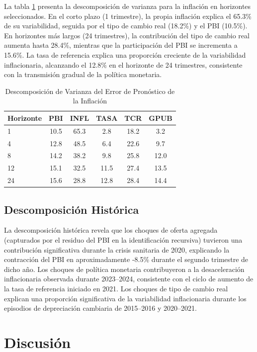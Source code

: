 \documentclass[12pt,a4paper]{article}
\begin{document}
La tabla \ref{tab:fevd} presenta la descomposición de varianza para la inflación en horizontes seleccionados. En el corto plazo (1 trimestre), la propia inflación explica el 65.3\% de su variabilidad, seguida por el tipo de cambio real (18.2\%) y el PBI (10.5\%). En horizontes más largos (24 trimestres), la contribución del tipo de cambio real aumenta hasta 28.4\%, mientras que la participación del PBI se incrementa a 15.6\%. La tasa de referencia explica una proporción creciente de la variabilidad inflacionaria, alcanzando el 12.8\% en el horizonte de 24 trimestres, consistente con la transmisión gradual de la política monetaria.

\begin{table}[H]
\centering
\caption{Descomposición de Varianza del Error de Pronóstico de la Inflación}
\label{tab:fevd}
\begin{tabular}{lccccc}
\toprule
\textbf{Horizonte} & \textbf{PBI} & \textbf{INFL} & \textbf{TASA} & \textbf{TCR} & \textbf{GPUB}\\
\midrule
1 & 10.5 & 65.3 & 2.8 & 18.2 & 3.2\\
4 & 12.8 & 48.5 & 6.4 & 22.6 & 9.7\\
8 & 14.2 & 38.2 & 9.8 & 25.8 & 12.0\\
12 & 15.1 & 32.5 & 11.5 & 27.4 & 13.5\\
24 & 15.6 & 28.8 & 12.8 & 28.4 & 14.4\\
\bottomrule
\end{tabular}
\end{table}

\subsection{Descomposición Histórica}

La descomposición histórica revela que los choques de oferta agregada (capturados por el residuo del PBI en la identificación recursiva) tuvieron una contribución significativa durante la crisis sanitaria de 2020, explicando la contracción del PBI en aproximadamente -8.5\% durante el segundo trimestre de dicho año. Los choques de política monetaria contribuyeron a la desaceleración inflacionaria observada durante 2023--2024, consistente con el ciclo de aumento de la tasa de referencia iniciado en 2021. Los choques de tipo de cambio real explican una proporción significativa de la variabilidad inflacionaria durante los episodios de depreciación cambiaria de 2015--2016 y 2020--2021.

\section{Discusión}
\end{document}
